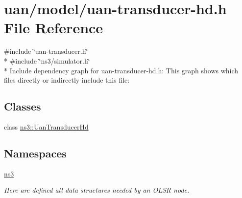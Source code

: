 \hypertarget{uan-transducer-hd_8h}{}\section{uan/model/uan-\/transducer-\/hd.h File Reference}
\label{uan-transducer-hd_8h}
{\ttfamily \#include \char`\"{}uan-\/transducer.\+h\char`\"{}}\\*
{\ttfamily \#include \char`\"{}ns3/simulator.\+h\char`\"{}}\\*
Include dependency graph for uan-\/transducer-\/hd.h\+:
This graph shows which files directly or indirectly include this file\+:
\subsection*{Classes}
\begin{DoxyCompactItemize}
\item 
class \hyperlink{classns3_1_1UanTransducerHd}{ns3\+::\+Uan\+Transducer\+Hd}
\end{DoxyCompactItemize}
\subsection*{Namespaces}
\begin{DoxyCompactItemize}
\item 
 \hyperlink{namespacens3}{ns3}
\begin{DoxyCompactList}\small\item\em Here are defined all data structures needed by an O\+L\+SR node. \end{DoxyCompactList}\end{DoxyCompactItemize}
